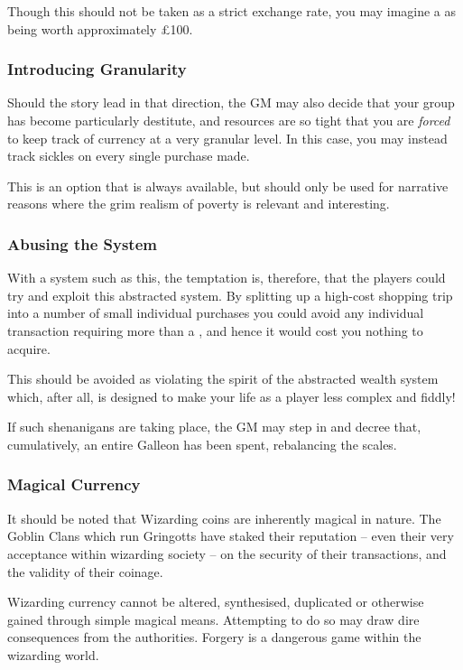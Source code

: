 Though this should not be taken as a strict exchange rate, you may imagine a  as being worth approximately £100.

\subsubsection{Introducing Granularity}

Should the story lead in that direction, the GM may also decide that your group has become particularly destitute, and resources are so tight that you are {\it forced} to keep track of currency at a very granular level. In this case, you may instead track sickles on every single purchase made. 

This is an option that is always available, but should only be used for narrative reasons where the grim realism of poverty is relevant and interesting. 

\subsubsection{Abusing the System}

With a system such as this, the temptation is, therefore, that the players could try and exploit this abstracted system. By splitting up a high-cost shopping trip into a number of small individual purchases you could avoid any individual transaction requiring more than a , and hence it would cost you nothing to acquire.

This should be avoided as violating the spirit of the abstracted wealth system which, after all, is designed to make your life as a player less complex and fiddly!

If such shenanigans are taking place, the GM may step in and decree that, cumulatively, an entire Galleon has been spent, rebalancing the scales. 

\subsubsection{Magical Currency}

It should be noted that Wizarding coins are inherently magical in nature. The Goblin Clans which run Gringotts have staked their reputation -- even their very acceptance within wizarding society -- on the security of their transactions, and the validity of their coinage. 

Wizarding currency cannot be altered, synthesised, duplicated or otherwise gained through simple magical means. Attempting to do so may draw dire consequences from the authorities. Forgery is a dangerous game within the wizarding world.


